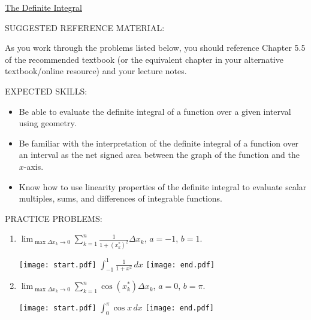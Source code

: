 \documentclass[12pt]{article}
\begin{document}
\begin{center}
\underline{\LARGE{The Definite Integral}}
\end{center}

\noindent SUGGESTED REFERENCE MATERIAL:

\bigskip

\noindent As you work through the problems listed below, you should reference Chapter 5.5 of the recommended textbook (or the equivalent chapter in your alternative textbook/online resource) and your lecture notes.

\bigskip

\noindent EXPECTED SKILLS:

\begin{itemize}

\item Be able to evaluate the definite integral of a function over a given interval using geometry.

\item Be familiar with the interpretation of the definite integral of a function over an interval as the net signed area between the graph of the function and the $x$-axis.

\item Know how to use linearity properties of the definite integral to evaluate scalar multiples, sums, and differences of integrable functions.  

\end{itemize}

\noindent PRACTICE PROBLEMS:

\medskip


\begin{enumerate}

\item $\lim_{\max \Delta x_k \rightarrow 0} \sum_{k=1}^n \frac{1}{1+(x_k^*)^2} \Delta x_k$, $a=-1$, $b=1$.

\texttt{[image: start.pdf]}
{{$\int_{-1}^1{\frac{1}{1+x^2}} \,dx$}}
\texttt{[image: end.pdf]}


\item $\lim_{\max \Delta x_k \rightarrow 0} \sum_{k=1}^n \cos{(x_k^*)} \Delta x_k$, $a=0$, $b=\pi$.

\texttt{[image: start.pdf]}
{{$\int_0^{\pi}\cos{x} \,dx$}}
\texttt{[image: end.pdf]}


\end{enumerate}
\end{document}
